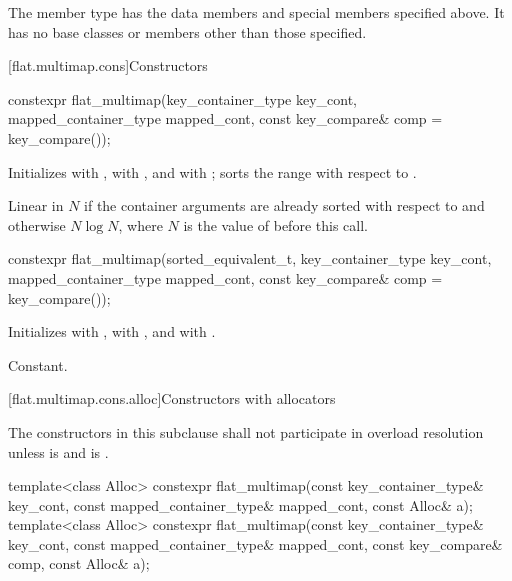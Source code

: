 \pnum
The member type  has the data members and special members
specified above. It has no base classes or members other than those
specified.

[flat.multimap.cons]{Constructors}

%
\begin{itemdecl}
constexpr flat_multimap(key_container_type key_cont, mapped_container_type mapped_cont,
                        const key_compare& comp = key_compare());
\end{itemdecl}

\begin{itemdescr}
\pnum
\effects
Initializes
 with ,
 with , and
 with ;
sorts the range  with respect to .

\pnum
\complexity
Linear in $N$ if the container arguments are already sorted
with respect to  and otherwise $N \log N$,
where $N$ is the value of  before this call.
\end{itemdescr}

%
\begin{itemdecl}
constexpr flat_multimap(sorted_equivalent_t, key_container_type key_cont,
                        mapped_container_type mapped_cont,
                        const key_compare& comp = key_compare());
\end{itemdecl}

\begin{itemdescr}
\pnum
\effects
Initializes
 with ,
 with , and
 with .

\pnum
\complexity
Constant.
\end{itemdescr}

[flat.multimap.cons.alloc]{Constructors with allocators}

\pnum
The constructors in this subclause shall not participate in overload resolution
unless  is 
and  is .

%
\begin{itemdecl}
template<class Alloc>
  constexpr flat_multimap(const key_container_type& key_cont,
                          const mapped_container_type& mapped_cont, const Alloc& a);
template<class Alloc>
  constexpr flat_multimap(const key_container_type& key_cont,
                          const mapped_container_type& mapped_cont,
                          const key_compare& comp, const Alloc& a);
\end{itemdecl}

